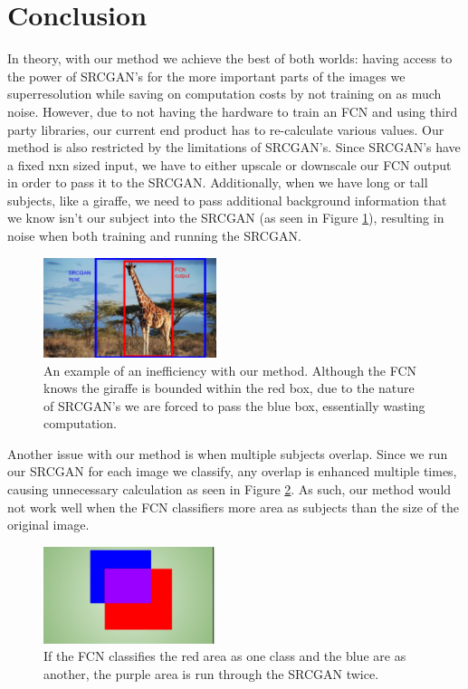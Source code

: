 \section{Conclusion}

In theory, with our method we achieve the best of both worlds: having access to the power of SRCGAN’s for the more important parts of the images we superresolution while saving on computation costs by not training on as much noise. However, due to not having the hardware to train an FCN and using third party libraries, our current end product has to re-calculate various values.
Our method is also restricted by the limitations of SRCGAN’s. Since SRCGAN’s
have a fixed nxn sized input, we have to either upscale or downscale our FCN
output in order to pass it to the SRCGAN. Additionally, when we have long or
tall subjects, like a giraffe, we need to pass additional background information
that we know isn’t our subject into the SRCGAN (as seen in Figure \ref{fig:giraffe}), resulting in
noise when both training and running the SRCGAN.

\begin{figure}
    \centering
    \includegraphics[width=0.45\textwidth]{images/giraffe.png}
    \caption{An example of an inefficiency with our method. Although the FCN knows the giraffe is bounded within the red box, due to the nature of SRCGAN's we are forced to pass the blue box, essentially wasting computation.}
    \label{fig:giraffe}
\end{figure}


Another issue with our method is when multiple subjects overlap. Since we run our SRCGAN for each image we classify, any overlap is enhanced multiple times, causing unnecessary calculation as seen in Figure \ref{fig:crossover}. As such, our method would not work well when the FCN classifiers more area as subjects than the size of the original image.

\begin{figure}
    \centering
    \includegraphics[width=0.45\textwidth]{images/crossover.png}
    \caption{If the FCN classifies the red area as one class and the blue are as another, the purple area is run through the SRCGAN twice.}
    \label{fig:crossover}
\end{figure}


